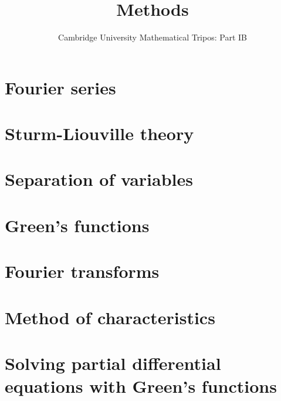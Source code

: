 \documentclass{article}
\title{Methods}
\author{Cambridge University Mathematical Tripos: Part IB}
\begin{document}
\maketitle

\tableofcontentsnewpage{}

\section{Fourier series}

\section{Sturm-Liouville theory}

\section{Separation of variables}

\section{Green's functions}

\section{Fourier transforms}

\section{Method of characteristics}

\section{Solving partial differential equations with Green's functions}

\end{document}
